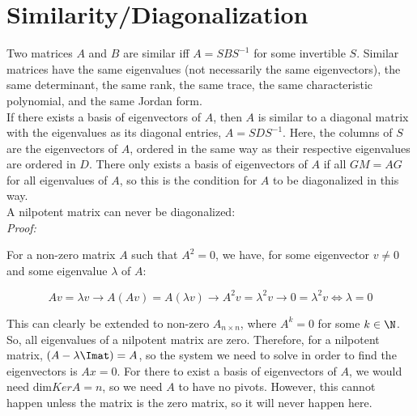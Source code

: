 \section*{Similarity/Diagonalization}

Two matrices $A$ and $B$ are similar iff $A=SBS^{-1}$ for some invertible $S$. Similar matrices have the same eigenvalues (not necessarily the same eigenvectors), the same determinant, the same rank, the same trace, the same characteristic polynomial, and the same Jordan form.\\

If there exists a basis of eigenvectors of $A$, then $A$ is similar to a diagonal matrix with the eigenvalues as its diagonal entries, $A=SDS^{-1}$. Here, the columns of $S$ are the eigenvectors of $A$, ordered in the same way as their respective eigenvalues are ordered in $D$. There only exists a basis of eigenvectors of $A$ if all $GM=AG$ for all eigenvalues of $A$, so this is the condition for $A$ to be diagonalized in this way.\\

A nilpotent matrix can never be diagonalized:\\

\textit{Proof:}

For a non-zero matrix $A$ such that $A^2=0$, we have, for some eigenvector $v\neq0$ and some eigenvalue $\lambda$ of $A$: 

$$Av=\lambda v \rightarrow A(Av)=A(\lambda v)\rightarrow A^2v=\lambda^2v \rightarrow 0=\lambda^2v\Leftrightarrow \lambda=0$$

This can clearly be extended to non-zero $A_{n \times n}$, where $A^k=0$ for some $k \in \N$. So, all eigenvalues of a nilpotent matrix are zero. Therefore, for a nilpotent matrix, $(A-\lambda\Imat)=A$, so the system we need to solve in order to find the eigenvectors is $Ax=0$. For there to exist a basis of eigenvectors of $A$, we would need $\text{dim}KerA=n$, so we need $A$ to have no pivots. However, this cannot happen unless the matrix is the zero matrix, so it will never happen here.\\